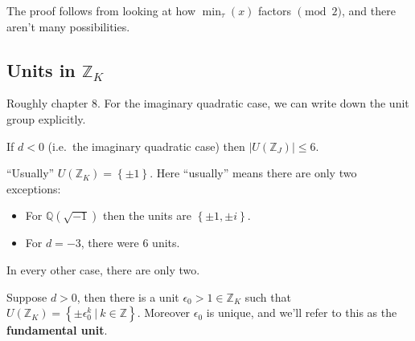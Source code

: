 \begin{remark}

The proof follows from looking at how \(\min_\tau(x)\) factors
\(\pmod 2\), and there aren't many possibilities.

\end{remark}

\hypertarget{units-in-mathbbz_k}{%
\subsection{\texorpdfstring{Units in
\({\mathbb{Z}}_K\)}{Units in \{\textbackslash mathbb\{Z\}\}\_K}}\label{units-in-mathbbz_k}}

\begin{remark}

Roughly chapter 8. For the imaginary quadratic case, we can write down
the unit group explicitly.

\end{remark}

\begin{proposition}

If \(d<0\) (i.e.~the imaginary quadratic case) then
\({\left\lvert { U({\mathbb{Z}}_J)} \right\rvert} \leq 6\).

\end{proposition}

\begin{remark}

``Usually'' \(U({\mathbb{Z}}_K) = \left\{{ \pm 1 }\right\}\). Here
``usually'' means there are only two exceptions:

\begin{itemize}
\item
  For \({\mathbb{Q}}( \sqrt{-1} )\) then the units are
  \(\left\{{ \pm 1, \pm i }\right\}\).
\item
  For \(d=-3\), there were 6 units.
\end{itemize}

In every other case, there are only two.

\end{remark}

\begin{proposition}

Suppose \(d>0\), then there is a unit
\(\epsilon_0 > 1 \in {\mathbb{Z}}_K\) such that
\(U({\mathbb{Z}}_K) = \left\{{ \pm \epsilon_0 ^k {~\mathrel{\Big|}~}k\in {\mathbb{Z}}}\right\}\).
Moreover \(\epsilon_0\) is unique, and we'll refer to this as the
\textbf{fundamental unit}.

\end{proposition}

